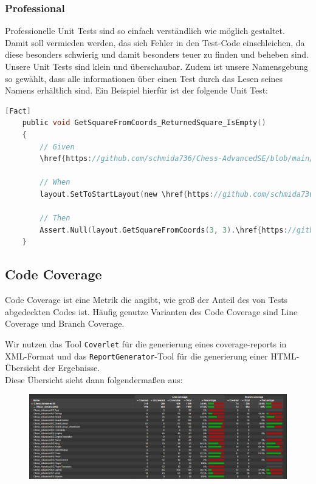 \documentclass[
10pt, %
a4paper, %
oneside, %
headinclude,footinclude, %
BCOR5mm, %
]{scrartcl}
\begin{document}
\begin{onehalfspace}
\subsubsection{Professional}
Professionelle Unit Tests sind so einfach verständlich wie möglich gestaltet. Damit soll vermieden werden, das sich Fehler in den Test-Code einschleichen, da diese besonders schwierig und damit besonders teuer zu finden und beheben sind.
Unsere Unit Tests sind klein und überschaubar. Zudem ist unsere Namensgebung so gewählt, dass alle informationen über einen Test durch das Lesen seines Namens erhältlich sind. Ein Beispiel hierfür ist der folgende Unit Test:
\begin{lstlisting}[language=c, style=mStyle]
	[Fact]
	public void GetSquareFromCoords_ReturnedSquare_IsEmpty()
	{
		// Given
		\href{https://github.com/schmida736/Chess-AdvancedSE/blob/main/Chess-AdvancedSE/Game\%20Elements/BoardLayout.cs}{BoardLayout} layout = new();

		// When
		layout.SetToStartLayout(new \href{https://github.com/schmida736/Chess-AdvancedSE/blob/main/Chess-AdvancedSE/Game\%20Elements/Player.cs}{Player}());
		
		// Then
		Assert.Null(layout.GetSquareFromCoords(3, 3).\href{https://github.com/schmida736/Chess-AdvancedSE/blob/main/Chess-AdvancedSE/Game\%20Elements/Pieces/Piece.cs}{Piece});
	}
\end{lstlisting}

\subsection{Code Coverage}
Code Coverage ist eine Metrik die angibt, wie 
groß der Anteil des von Tests abgedeckten Codes ist. Häufig genutze Varianten des Code Coverage sind Line Coverage und Branch Coverage.

Wir nutzen das Tool \texttt{Coverlet} für die generierung eines coverage-reports in XML-Format und das \texttt{ReportGenerator}-Tool für die generierung einer HTML-Übersicht der Ergebnisse.
\\
Diese Übersicht sieht dann folgendermaßen aus:
\begin{figure}[ht!]
	\includegraphics[width=\linewidth]{coveragereport}
\end{figure}


\end{onehalfspace}
\end{document}
